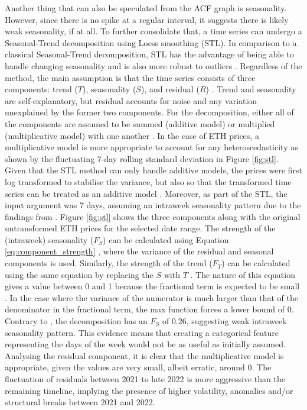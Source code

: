 \documentclass[ %
                    author={Raj Dhakan},
                supervisor={Dr. Ayush Joshi},
                    degree={MSc},
                     title={Ethereum Price Prediction using Internal and External Factors},
                  subtitle={},
                      type={},
                      year={2025}]{dissertation}
\begin{document}
 Another thing that can also be speculated from the ACF graph is seasonality. However, since there is no spike at a regular interval, it suggests there is likely weak seasonality, if at all. To further consolidate that, a time series can undergo a Seasonal-Trend decomposition using Loess smoothing (STL). In comparison to a classical Seasonal-Trend decomposition, STL has the advantage of being able to handle changing seasonality and is also more robust to outliers \cite{Hyndman2018}. Regardless of the method, the main assumption is that the time series consists of three components: trend ($T$), seasonality ($S$), and residual ($R$) \cite{Hyndman2018}. Trend and seasonality are self-explanatory, but residual accounts for noise and any variation unexplained by the former two components. For the decomposition, either all of the components are assumed to be summed (additive model) or multiplied (multiplicative model) with one another \cite{Hyndman2018}. In the case of ETH prices, a multiplicative model is more appropriate to account for any heteroscedasticity \cite{Hyndman2018} as shown by the fluctuating 7-day rolling standard deviation in Figure \ref{fig:stl}. Given that the STL method can only handle additive models, the prices were first log transformed to stabilise the variance, but also so that the transformed time series can be treated as an additive model \cite{Hyndman2018}. Moreover, as part of the STL, the input argument was 7 days, assuming an intraweek seasonality pattern due to the findings from \cite{jasiak2024intraday}. Figure \ref{fig:stl} shows the three components along with the original untransformed ETH prices for the selected date range. The strength of the (intraweek) seasonality ($F_S$) can be calculated using Equation \ref{eq:component_strength} \cite{Hyndman2018}, where the variance of the residual and seasonal components is used. Similarly, the strength of the trend ($F_T$) can be calculated using the same equation by replacing the $S$ with $T$ \cite{Hyndman2018}. The nature of this equation gives a value between 0 and 1 because the fractional term is expected to be small \cite{Hyndman2018}. In the case where the variance of the numerator is much larger than that of the denominator in the fractional term, the max function forces a lower bound of 0. Contrary to \cite{jasiak2024intraday}, the decomposition has an $F_S$ of 0.26, suggesting weak intraweek seasonality pattern. This evidence means that creating a categorical feature representing the days of the week would not be as useful as initially assumed. Analysing the residual component, it is clear that the multiplicative model is appropriate, given the values are very small, albeit erratic, around 0. The fluctuation of residuals between 2021 to late 2022 is more aggressive than the remaining timeline, implying the presence of higher volatility, anomalies and/or structural breaks between 2021 and 2022.
\end{document}
